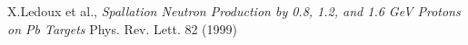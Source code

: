 \documentclass[a4paper]{jpconf}
\begin{document}
\begin{thebibliography}{9}
 X.Ledoux et al., \emph{Spallation Neutron Production by
  0.8, 1.2, and 1.6 GeV Protons on Pb Targets} Phys. Rev. Lett. 82 (1999)
\end{thebibliography}
\end{document}
